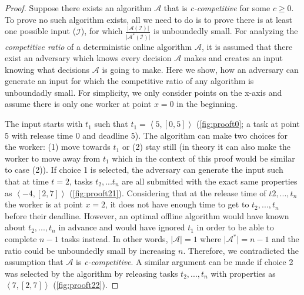 \begin{proof}
Suppose there exists an algorithm $\mathcal{A}$ that is \textit{c-competitive} for some $c \geq 0$. To prove no such algorithm exists, all we need to do is to prove there is at least one possible input ($\mathcal{I}$), for which $\frac{\vert \mathcal{A}(\mathcal{I}) \vert}{\vert \mathcal{A}^{*}(\mathcal{I}) \vert}$ is unboundedly small. For analyzing the \textit{competitive ratio} of a deterministic online algorithm $\mathcal{A}$, it is assumed that there exist an adversary which knows every decision $\mathcal{A}$ makes and creates an input knowing what decisions $\mathcal{A}$ is going to make. Here we show, how an adversary can generate an input for which the competitive ratio of any algorithm is unboundadly small. For simplicity, we only consider points on the x-axis and assume there is only one worker at point $x=0$ in the beginning.

The input starts with $t_1$ such that $t_1 = \left\langle 5, \left[0, 5 \right] \right\rangle$ (\cref{fig:prooft0}; a task at point $5$ with release time $0$ and deadline $5$). The algorithm can make two choices for the worker: (1) move towards $t_1$ or (2) stay still (in theory it can also make the worker  to move away from $t_1$ which in the context of this proof would be similar to case (2)). If choice 1 is selected, the adversary can generate the input such that at time $t = 2$, tasks $t_2, ... t_n$ are all submitted with the exact same properties as $\left\langle -4, \left[2, 7 \right] \right\rangle$ (\cref{fig:prooft21}). Considering that at the release time of $t2, ..., t_n$ the worker is at point $x=2$, it does not have enough time to get to $t_2, ..., t_n$ before their deadline. However, an optimal offline algorithm would have known about $t_2, ..., t_n$ in advance and would have ignored $t_1$ in order to be able to complete $n-1$ tasks instead. In other words, $\vert \mathcal{A} \vert = 1$ where $\vert \mathcal{A}^{*} \vert = n - 1$ and the ratio could be unboundedly small by increasing $n$. Therefore, we contradicted the assumption that $\mathcal{A}$ is \textit{c-competitive}. A similar argument can be made if choice 2 was selected by the algorithm by releasing tasks $t_2, ...,t_n$ with properties as $\left\langle 7, \left[2, 7 \right] \right\rangle$ (\cref{fig:prooft22}).
\end{proof}

